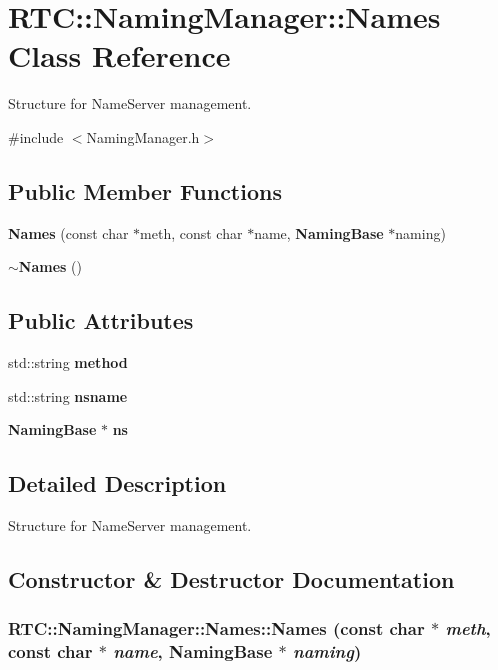 \section{RTC::NamingManager::Names Class Reference}
\label{classRTC_1_1NamingManager_1_1Names}


Structure for NameServer management.  




{\ttfamily \#include $<$NamingManager.h$>$}

\subsection*{Public Member Functions}
\begin{DoxyCompactItemize}
\item 
{\bf Names} (const char $\ast$meth, const char $\ast$name, {\bf NamingBase} $\ast$naming)
\item 
{\bf $\sim$Names} ()
\end{DoxyCompactItemize}
\subsection*{Public Attributes}
\begin{DoxyCompactItemize}
\item 
std::string {\bf method}
\item 
std::string {\bf nsname}
\item 
{\bf NamingBase} $\ast$ {\bf ns}
\end{DoxyCompactItemize}


\subsection{Detailed Description}
Structure for NameServer management. 

\subsection{Constructor \& Destructor Documentation}
\subsubsection[{Names}]{\setlength{\rightskip}{0pt plus 5cm}RTC::NamingManager::Names::Names (const char $\ast$ {\em meth}, \/  const char $\ast$ {\em name}, \/  {\bf NamingBase} $\ast$ {\em naming})\hspace{0.3cm}{\ttfamily  [inline]}}\label{classRTC_1_1NamingManager_1_1Names_a41f1f4ab7a1312266066594e550105c2}
